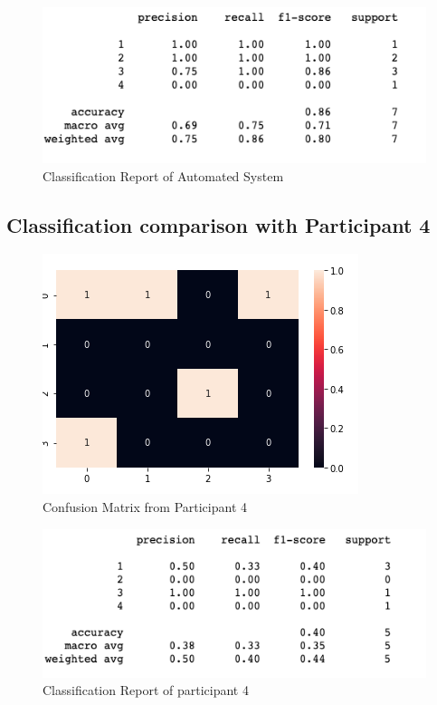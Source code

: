 \begin{figure}[!htp]
    \includegraphics[width=\textwidth]{Images/a3r.png}
    \caption{Classification Report of Automated System}
    \label{fig:f11}
\end{figure}

\pagebreak
\subsection*{Classification comparison with Participant 4 }

\begin{figure}[!htp]
    \includegraphics[width=\textwidth]{Images/p4.png}
    \caption{Confusion Matrix from Participant 4}
    \label{fig:f11}
\end{figure}

\begin{figure}[!htp]
    \includegraphics[width=\textwidth]{Images/p4r.png}
    \caption{Classification Report of participant 4}
    \label{fig:f11}
\end{figure}

